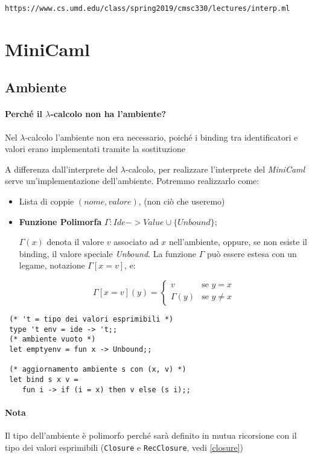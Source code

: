 \documentclass[a4paper,10pt]{article}
\begin{document}
\texttt{https://www.cs.umd.edu/class/spring2019/cmsc330/lectures/interp.ml}

\newpage
\section{MiniCaml}
\subsection{Ambiente}
\paragraph{Perché il $\lambda$-calcolo non ha l'ambiente?}Nel $\lambda$-calcolo l'ambiente non era necessario, poiché i binding tra identificatori e valori erano implementati tramite la sostituzione\medskip

A differenza dall'interprete del $\lambda$-calcolo, per realizzare l'interprete del \emph{MiniCaml} serve un'implementazione dell'ambiente. Potremmo realizzarlo come:
\begin{itemize}
 \item Lista di coppie $(nome, valore)$, \small (non ciò che useremo)
 \item \normalsize\textbf{Funzione Polimorfa} $\Gamma : Ide -> Value \cup \{Unbound\}$; 
 
 $\Gamma(x)$ denota il valore $v$ associato ad $x$ nell'ambiente, oppure, se non esiste il binding, il valore speciale \emph{Unbound}. La funzione $\Gamma$ può essere estesa con un legame, notazione $\Gamma[x = v]$, e:
 
 \[ \Gamma [x = v](y) = \begin{cases}
                            v & \text{se }y = x\\
                            \Gamma(y) &\text{se } y \neq x
                        \end{cases}
 \]
\end{itemize}

\begin{lstlisting}
 (* 't = tipo dei valori esprimibili *)
 type 't env = ide -> 't;; 
 (* ambiente vuoto *)
 let emptyenv = fun x -> Unbound;;
 
 (* aggiornamento ambiente s con (x, v) *)
 let bind s x v = 
    fun i -> if (i = x) then v else (s i);;
\end{lstlisting}
{\it
\paragraph{Nota} Il tipo dell'ambiente è polimorfo perché sarà definito in mutua ricorsione con il tipo dei valori esprimibili (\texttt{Closure} e \texttt{RecClosure}, vedi \ref{closure})
}
\end{document}
